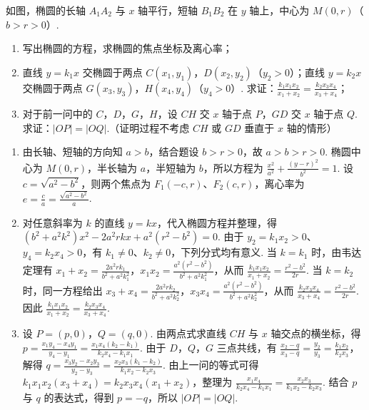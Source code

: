 \begin{problem}
如图，椭圆的长轴 \(A_1A_2\) 与 \(x\) 轴平行，短轴 \(B_1B_2\) 在 \(y\) 轴上，中心为 \(M(0,r)\)（\(b>r>0\)）.

\begin{enumerate}
\item 写出椭圆的方程，求椭圆的焦点坐标及离心率；
\item 直线 \(y=k_1x\) 交椭圆于两点 \(C(x_1,y_1)\)，\(D(x_2,y_2)\)（\(y_2>0\)）；直线 \(y=k_2x\) 交椭圆于两点 \(G(x_3,y_3)\)，\(H(x_4,y_4)\)（\(y_4>0\)）. 求证：\(\frac{k_1x_1x_2}{x_1+x_2}=\frac{k_2x_3x_4}{x_3+x_4}\)；
\item 对于前一问中的 \(C\)，\(D\)，\(G\)，\(H\)，设 \(CH\) 交 \(x\) 轴于点 \(P\)，\(GD\) 交 \(x\) 轴于点 \(Q\). 求证：\(|OP|=|OQ|\).（证明过程不考虑 \(CH\) 或 \(GD\) 垂直于 \(x\) 轴的情形）
\end{enumerate}

\begin{solution}
\begin{enumerate}
\item 由长轴、短轴的方向知 \(a>b\)，结合题设 \(b>r>0\)，故 \(a>b>r>0\). 椭圆中心为 \(M(0,r)\)，半长轴为 \(a\)，半短轴为 \(b\)，所以方程为 \(\displaystyle\frac{x^2}{a^2}+\frac{(y-r)^2}{b^2}=1\). 设 \(c=\sqrt{a^2-b^2}\)，则两个焦点为 \(F_1(-c,r)\)、\(F_2(c,r)\)，离心率为 \(e=\frac ca=\frac{\sqrt{a^2-b^2}}a\).
\item 对任意斜率为 \(k\) 的直线 \(y=kx\)，代入椭圆方程并整理，得 \((b^2+a^2k^2)x^2-2a^2rkx+a^2(r^2-b^2)=0\). 由于 \(y_2=k_1x_2>0\)、\(y_4=k_2x_4>0\)，有 \(k_1\ne0\)、\(k_2\ne0\)，下列分式均有意义. 当 \(k=k_1\) 时，由韦达定理有 \(x_1+x_2=\frac{2a^2rk_1}{b^2+a^2k_1^2}\)，\(x_1x_2=\frac{a^2(r^2-b^2)}{b^2+a^2k_1^2}\)，从而 \(\displaystyle\frac{k_1x_1x_2}{x_1+x_2}=\frac{r^2-b^2}{2r}\). 当 \(k=k_2\) 时，同一方程给出 \(x_3+x_4=\frac{2a^2rk_2}{b^2+a^2k_2^2}\)，\(x_3x_4=\frac{a^2(r^2-b^2)}{b^2+a^2k_2^2}\)，从而 \(\displaystyle\frac{k_2x_3x_4}{x_3+x_4}=\frac{r^2-b^2}{2r}\). 因此 \(\displaystyle\frac{k_1x_1x_2}{x_1+x_2}=\frac{k_2x_3x_4}{x_3+x_4}\).
\item 设 \(P=(p,0)\)，\(Q=(q,0)\). 由两点式求直线 \(CH\) 与 \(x\) 轴交点的横坐标，得 \(\displaystyle p=\frac{x_1y_4-x_4y_1}{y_4-y_1}=\frac{x_1x_4(k_2-k_1)}{k_2x_4-k_1x_1}\). 由于 \(D\)，\(Q\)，\(G\) 三点共线，有 \(\displaystyle\frac{x_2-q}{x_3-q}=\frac{y_2}{y_3}=\frac{k_1x_2}{k_2x_3}\)，解得 \(\displaystyle q=\frac{x_3y_2-x_2y_3}{y_2-y_3}=\frac{x_2x_3(k_1-k_2)}{k_1x_2-k_2x_3}\). 由上一问的等式可得 \(k_1x_1x_2(x_3+x_4)=k_2x_3x_4(x_1+x_2)\)，整理为 \(\displaystyle\frac{x_1x_4}{k_2x_4-k_1x_1}=\frac{x_2x_3}{k_1x_2-k_2x_3}\). 结合 \(p\) 与 \(q\) 的表达式，得到 \(p=-q\)，所以 \(\lvert OP\rvert=\lvert OQ\rvert\).
\end{enumerate}
\end{solution}
\end{problem}

